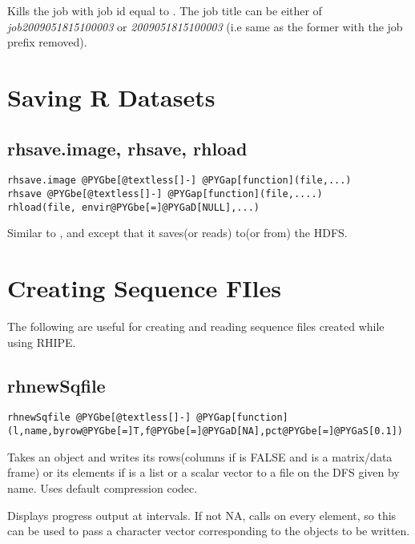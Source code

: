 \documentclass[letterpaper,10pt,english]{manual}
\begin{document}
Kills the job with job id equal to . The job title can be either of
\emph{job2009051815100003} or \emph{2009051815100003} (i.e same as the former with the job
prefix removed).


\section{Saving R Datasets}


\subsection{rhsave.image, rhsave, rhload}

\begin{Verbatim}[commandchars=@\[\]]
rhsave.image @PYGbe[@textless[]-] @PYGap[function](file,...)
rhsave @PYGbe[@textless[]-] @PYGap[function](file,....)
rhload(file, envir@PYGbe[=]@PYGaD[NULL],...)
\end{Verbatim}

Similar to ,  and  except that it saves(or reads)
 to(or from) the HDFS.


\section{Creating Sequence FIles}

The following are useful for creating and reading sequence files created while
using RHIPE.


\subsection{rhnewSqfile}

\begin{Verbatim}[commandchars=@\[\]]
rhnewSqfile @PYGbe[@textless[]-] @PYGap[function](l,name,byrow@PYGbe[=]T,f@PYGbe[=]@PYGaD[NA],pct@PYGbe[=]@PYGaS[0.1])
\end{Verbatim}

Takes an object and writes its rows(columns if  is FALSE and  is a matrix/data frame) or its elements if  is a list or a scalar vector to a file on the DFS given by name. Uses default compression codec.

Displays progress output at  intervals. If not NA,  calls  on every element, so this can be used to pass a character vector corresponding to the objects to be written.
\end{document}
